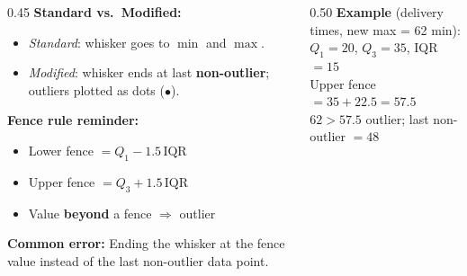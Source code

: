 \documentclass[aspectratio=169, 11pt]{beamer}
\begin{document}
{
\begin{frame}[t, plain]
  \vspace{0.45cm}\par
  \hspace{0.55cm}%
  \begin{minipage}{0.9\textwidth}

    \small
    \begin{columns}[T]
    \begin{column}{0.45\textwidth}
      \textbf{Standard vs.\ Modified:}
      \begin{itemize}\setlength{\itemsep}{0.4em}
        \item \textit{Standard}: whisker goes to $\min$ and $\max$.
        \item \textit{Modified}: whisker ends at last \textbf{non-outlier};
              outliers plotted as dots ($\bullet$).
      \end{itemize}

      \vspace{0.6em}
      \textbf{Fence rule reminder:}
      \begin{itemize}\setlength{\itemsep}{0.3em}
        \item Lower fence $= Q_1 - 1.5\,\text{IQR}$
        \item Upper fence $= Q_3 + 1.5\,\text{IQR}$
        \item Value \textbf{beyond} a fence $\Rightarrow$ outlier
      \end{itemize}

      \vspace{0.4em}
      {\color{redacc}\textbf{Common error:} Ending the whisker at the
      fence value instead of the last non-outlier data point.}
    \end{column}
    \begin{column}{0.50\textwidth}
      \textbf{Example} (delivery times, new max = 62 min):\\
      $Q_1=20$, $Q_3=35$, IQR $=15$\\
      Upper fence $= 35+22.5 = 57.5$\\
      $62 > 57.5$ \textrightarrow{} outlier; last non-outlier $= 48$


\end{column}
\end{columns}
\end{minipage}
\end{frame}}
\end{document}
